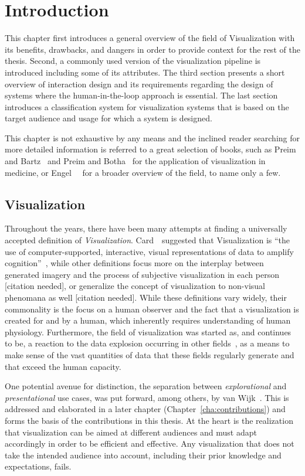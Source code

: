 \chapter{Introduction} \label{cha:intro}
This chapter first introduces a general overview of the field of Visualization with its benefits, drawbacks, and dangers in order to provide context for the rest of the thesis.  Second, a commonly used version of the visualization pipeline is introduced including some of its attributes.  The third section presents a short overview of interaction design and its requirements regarding the design of systems where the human-in-the-loop approach is essential.  The last section introduces a classification system for visualization systems that is based on the target audience and usage for which a system is designed.

This chapter is not exhaustive by any means and the inclined reader searching for more detailed information is referred to a great selection of books, such as Preim and Bartz~\cite{preim2007visualization} and Preim and Botha~\cite{preim2013visual} for the application of visualization in medicine, or Engel~\etal~\cite{engel2006real} for a broader overview of the field, to name only a few.

\section{Visualization} \label{cha:intro:vis}
Throughout the years, there have been many attempts at finding a universally accepted definition of \emph{Visualization}.  Card~\etal~suggested that Visualization is ``the use of computer-supported, interactive, visual representations of data to amplify cognition''~\cite{card1999readings}, while other definitions focus more on the interplay between generated imagery and the process of subjective visualization in each person [citation needed], or generalize the concept of visualization to non-visual phenomana as well [citation needed].  While these definitions vary widely, their commonality is the focus on a human observer and the fact that a visualization is created for and by a human, which inherently requires understanding of human physiology.  Furthermore, the field of visualization was started as, and continues to be, a reaction to the data explosion occurring in other fields~\cite{lorensen2004death}, as a means to make sense of the vast quantities of data that these fields regularly generate and that exceed the human capacity.

One potential avenue for distinction, the separation between \emph{explorational} and \emph{presentational} use cases, was put forward, among others, by van Wijk~\cite{van2005value}.  This is addressed and elaborated in a later chapter (Chapter~\ref{cha:contributions}) and forms the basis of the contributions in this thesis.  At the heart is the realization that visualization can be aimed at different audiences and must adapt accordingly in order to be efficient and effective.  Any visualization that does not take the intended audience into account, including their prior knowledge and expectations, fails.

